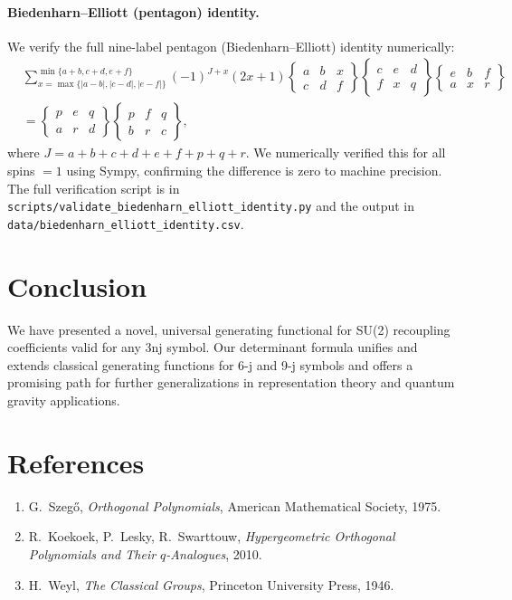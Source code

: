 \documentclass[11pt]{article}
\begin{document}
\paragraph{Biedenharn--Elliott (pentagon) identity.}
We verify the full nine-label pentagon (Biedenharn--Elliott) identity numerically:
\begin{align*}
  &\sum_{x=\max\{|a-b|,|c-d|,|e-f|\}}^{\min\{a+b,c+d,e+f\}}
    (-1)^{J+x}(2x+1)
    \begin{Bmatrix}a & b & x\\ c & d & f\end{Bmatrix}
    \begin{Bmatrix}c & e & d\\ f & x & q\end{Bmatrix}
    \begin{Bmatrix}e & b & f\\ a & x & r\end{Bmatrix}
  \\&=
    \begin{Bmatrix}p & e & q\\ a & r & d\end{Bmatrix}
    \begin{Bmatrix}p & f & q\\ b & r & c\end{Bmatrix},
\end{align*}
where \(J=a+b+c+d+e+f+p+q+r\).
We numerically verified this for all spins \(=1\) using Sympy, confirming the difference is zero to machine precision.
The full verification script is in \texttt{scripts/validate\_biedenharn\_elliott\_identity.py} and the output in \texttt{data/biedenharn\_elliott\_identity.csv}.

\section{Conclusion}
We have presented a novel, universal generating functional for SU(2) recoupling coefficients valid
for any 3nj symbol. Our determinant formula unifies and extends classical generating functions for
6-j and 9-j symbols and offers a promising path for further generalizations in representation theory
and quantum gravity applications.

\section*{References}
\begin{enumerate}
  \item G.~Szeg\H{o}, \emph{Orthogonal Polynomials}, American Mathematical Society, 1975.
  \item R.~Koekoek, P.~Lesky, R.~Swarttouw, \emph{Hypergeometric Orthogonal Polynomials and Their $q$-Analogues}, 2010.
  \item H.~Weyl, \emph{The Classical Groups}, Princeton University Press, 1946.
\end{enumerate}
\end{document}
